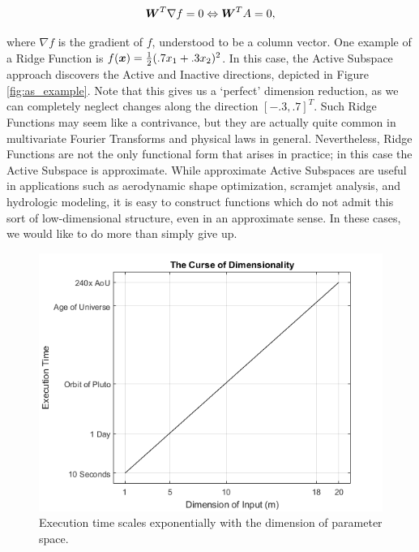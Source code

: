 \documentclass[]{aiaa-tc}%
\begin{document}
\begin{equation}
\boldsymbol{W}^T\nabla f = 0 \Leftrightarrow \boldsymbol{W}^TA = 0, \label{eq:ridge_property}
\end{equation}

where $\nabla f$ is the gradient of $f$, understood to be a column vector. One example of a Ridge Function is $f(\boldsymbol{x}) = \frac{1}{2}(.7x_1+.3x_2)^2$. In this case, the Active Subspace approach discovers the Active and Inactive directions, depicted in Figure \ref{fig:as_example}. Note that this gives us a `perfect' dimension reduction, as we can completely neglect changes along the direction $[-.3,.7]^T$. Such Ridge Functions may seem like a contrivance, but they are actually quite common in multivariate Fourier Transforms\cite{pinkus2015} and physical laws in general.\cite{Constantine2016} Nevertheless, Ridge Functions are not the only functional form that arises in practice; in this case the Active Subspace is approximate. While approximate Active Subspaces are useful in applications such as aerodynamic shape optimization\cite{lukaczyk2014}, scramjet analysis\cite{Constantine20151}, and hydrologic modeling\cite{Jefferson2015}, it is easy to construct functions which do not admit this sort of low-dimensional structure, even in an approximate sense. In these cases, we would like to do more than simply give up.

\begin{figure}
 \includegraphics{../images/curse_of_dimensionality}
 \caption{Execution time scales exponentially with the dimension of parameter space.}
 \label{fig:curse_of_dimensionality}
\end{figure}
\end{document}
